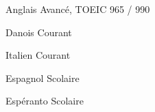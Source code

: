 


\begin{cvhonors}

  \cvhonor
    {Anglais} %
    {Avancé, TOEIC 965 / 990} %
    {\emojiflagus} %
    {} %

  \cvhonor
    {Danois} %
    {Courant} %
    {\emojiflagdk} %
    {} %

  \cvhonor
    {Italien} %
    {Courant} %
    {\emojiflagit} %
    {} %

  \cvhonor
    {Espagnol} %
    {Scolaire} %
    {\emojiflages} %
    {} %

  \cvhonor
    {Espéranto} %
    {Scolaire} %
    {} %
    {} %

\end{cvhonors}
